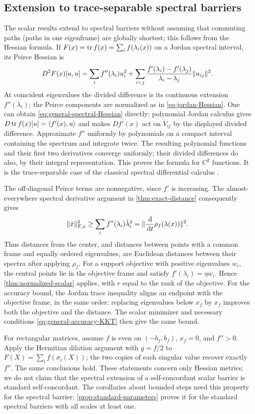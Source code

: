 \subsection{Extension to trace-separable spectral barriers}
\label{subsec:general-spectral-transfer}
The scalar results extend to spectral barriers without assuming that
commuting paths (paths in one eigenframe) are globally shortest; this
follows from the Hessian formula. If $F(x)=\operatorname{tr} f(x)=\sum_i f(\lambda_i(x))$
on a Jordan spectral interval, its Peirce Hessian is
\begin{equation}
 D^2F(x)[u,u]=\sum_i f''(\lambda_i)u_i^2+
 \sum_{i<j}\frac{f'(\lambda_i)-f'(\lambda_j)}{\lambda_i-\lambda_j}
          \lVert u_{ij}\rVert^2.
 \label{eq:general-spectral-Hessian}
\end{equation}
At coincident eigenvalues the divided difference is its continuous
extension $f''(\lambda_i)$; the Peirce components are normalized as in \eqref{eq:jordan-Hessian}. One can obtain
\eqref{eq:general-spectral-Hessian} directly: polynomial Jordan
calculus gives $D\operatorname{tr} f(x)[u]=\langle f'(x),u\rangle$ and makes
$Df'(x)$ act on $V_{ij}$ by the displayed divided difference.
Approximate $f''$ uniformly by polynomials on a compact interval
containing the spectrum and integrate twice. The resulting polynomial
functions and their first two derivatives converge uniformly; their
divided differences do also, by their integral representation.
This proves the formula for $C^2$ functions. It is the trace-separable
case of the classical spectral differential calculus
\cite{LewisSendov2001,Baes2007}.

The off-diagonal Peirce terms are nonnegative, since $f'$ is
increasing. The almost-everywhere spectral
derivative argument in \cref{thm:exact-distance} consequently gives
\[
 \lVert \dot x\rVert_{F,x}^2\geq
 \sum_i f''(\lambda_i)\dot\lambda_i^2
 =\lVert \frac{\,\mathrm d}{\,\mathrm d t}\rho_f(\lambda(x))\rVert^2.
\]
Thus distances from the center, and distances between points with a
common frame and equally ordered eigenvalues, are Euclidean distances
between their spectra after applying $\rho_f$. For a support objective
with positive eigenvalues $w_i$, the central points lie in the
objective frame and satisfy
$f'(\lambda_i)=\eta w_i$. Hence \cref{thm:normalized-scalar} applies,
with $r$ equal to the rank of the objective.
For the accuracy bound, the Jordan trace inequality aligns an endpoint
with the objective frame, in the same order; replacing
eigenvalues below $x_f$ by $x_f$ improves both the objective and the
distance. The scalar minimizer and necessary
conditions \eqref{eq:general-accuracy-KKT} then give the same bound.

For rectangular matrices, assume $f$ is even on $(-b_f,b_f)$,
$x_f=0$, and $f''>0$. Apply the Hermitian dilation argument with
$g=f/2$ to $F(X)=\sum_i f(\sigma_i(X))$; the two copies of each
singular value recover exactly $f''$. The same conclusions hold.
These statements concern only Hessian metrics; we do not claim
that the spectral extension of a self-concordant scalar barrier is
standard self-concordant. The corollaries about bounded steps need this
property for the spectral barrier; \cref{prop:standard-parameters}
proves it for the standard spectral barriers with all scales at least one.
